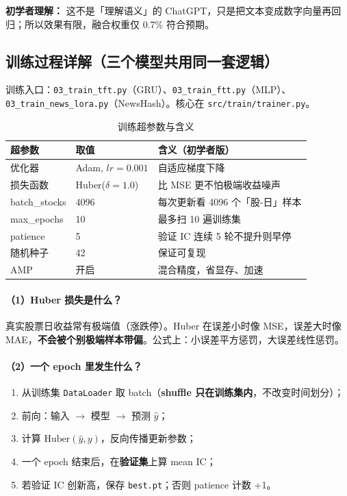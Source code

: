 \documentclass[UTF8,a4paper,12pt]{ctexart}
\begin{document}
\textbf{初学者理解：} 这不是「理解语义」的 ChatGPT，只是把文本变成数字向量再回归；所以效果有限，融合权重仅 0.7\% 符合预期。

\subsection{训练过程详解（三个模型共用同一套逻辑）}

训练入口：\texttt{03\_train\_tft.py}（GRU）、\texttt{03\_train\_ftt.py}（MLP）、\texttt{03\_train\_news\_lora.py}（NewsHash）。核心在 \texttt{src/train/trainer.py}。

\begin{table}[H]
\centering
\caption{训练超参数与含义}
\label{tab:hyper}
\begin{tabular}{llp{6cm}}
\toprule
\textbf{超参数} & \textbf{取值} & \textbf{含义（初学者版）} \\
\midrule
优化器 & Adam, $lr=0.001$ & 自适应梯度下降 \\
损失函数 & Huber($\delta=1.0$) & 比 MSE 更不怕极端收益噪声 \\
batch\_stocks & 4096 & 每次更新看 4096 个「股-日」样本 \\
max\_epochs & 10 & 最多扫 10 遍训练集 \\
patience & 5 & 验证 IC 连续 5 轮不提升则早停 \\
随机种子 & 42 & 保证可复现 \\
AMP & 开启 & 混合精度，省显存、加速 \\
\bottomrule
\end{tabular}
\end{table}

\paragraph{（1）Huber 损失是什么？}

真实股票日收益常有极端值（涨跌停）。Huber 在误差小时像 MSE，误差大时像 MAE，\textbf{不会被个别极端样本带偏}。公式上：小误差平方惩罚，大误差线性惩罚。

\paragraph{（2）一个 epoch 里发生什么？}

\begin{enumerate}[leftmargin=2em]
  \item 从训练集 \texttt{DataLoader} 取 batch（\textbf{shuffle 只在训练集内}，不改变时间划分）；
  \item 前向：输入 $\to$ 模型 $\to$ 预测 $\hat{y}$；
  \item 计算 $\mathrm{Huber}(\hat{y}, y)$，反向传播更新参数；
  \item 一个 epoch 结束后，在\textbf{验证集}上算 mean IC；
  \item 若验证 IC 创新高，保存 \texttt{best.pt}；否则 patience 计数 +1。
\end{enumerate}
\end{document}
